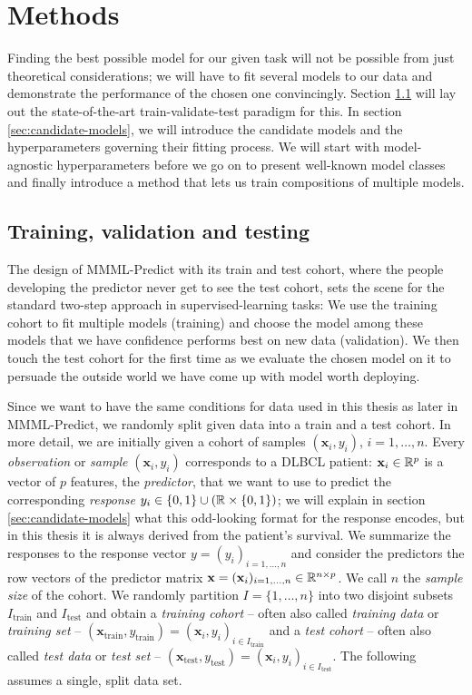 \chapter{Methods} \label{chap:methods}

Finding the best possible model for our given task will not be possible from just theoretical 
considerations; we will have to fit several models to our data and demonstrate the performance of 
the chosen one convincingly. Section \ref{sec:train-val-test} will lay out the state-of-the-art 
train-validate-test paradigm for this. In section \ref{sec:candidate-models}, we will introduce 
the candidate models and the hyperparameters governing their fitting process. We will start with 
model-agnostic hyperparameters before we go on to present well-known model classes and finally 
introduce a method that lets us train compositions of multiple models.

\section{Training, validation and testing}\label{sec:train-val-test}

The design of MMML-Predict with its train and test cohort, where the people developing the predictor 
never get to see the test cohort, sets the scene for the standard two-step approach in 
supervised-learning tasks: We use the training cohort to fit multiple models (training) and choose the model
among these models that we have confidence performs best on new data (validation). We then touch 
the test cohort for the first time as we evaluate the chosen model on it to persuade the outside 
world we have come up with model worth deploying.

Since we want to have the same conditions for data used in this thesis as later in MMML-Predict,
we randomly split given data into a train and a test cohort. In more detail, we are initially given 
a cohort of samples $(\mathbf{x}_i, y_i)$, $i = 1, \ldots, n$. Every \textit{observation} or \textit{sample}
$(\mathbf{x}_i, y_i)$ corresponds to a DLBCL patient: $\mathbf{x}_i \in \mathbb{R}^p$ is a vector of $p$ 
features, the \textit{predictor}, that we want to use to predict the corresponding \textit{response} 
$y_i \in \{0, 1\} \cup (\mathbb{R} \times \{0, 1\})$; we will explain in section \ref{sec:candidate-models} 
what this odd-looking format for the response encodes, but in this thesis it is always derived from 
the patient's survival. We summarize the 
responses to the response vector $y = (y_i)_{i = 1, \ldots, n}$ and consider the predictors the row 
vectors of the predictor matrix $\mathbf{x} = (\mathbf{x}_i)_{i = 1, \ldots, n} \in \mathbb{R}^{n \times p}$. We 
call $n$ the \textit{sample size} of the cohort. We randomly partition $I = \{1, \ldots, n\}$ into two 
disjoint subsets $I_\text{train}$ and $I_\text{test}$ and obtain a \textit{training cohort} -- often 
also called \textit{training data} or \textit{training set} --
$(\mathbf{x}_\text{train}, y_\text{train}) = (\mathbf{x}_i, y_i)_{i \in I_\text{train}}$ and a \textit{test 
cohort} -- often also called \textit{test data} or \textit{test set} -- 
$(\mathbf{x}_\text{test}, y_\text{test}) = (\mathbf{x}_i, y_i)_{i \in I_\text{test}}$. The following assumes 
a single, split data set.

